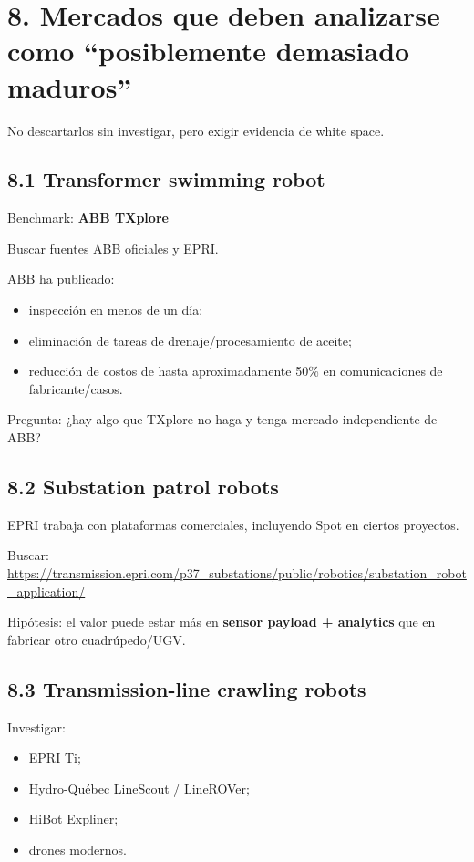\documentclass[11pt,a4paper]{article}
\begin{document}
\section*{8. Mercados que deben analizarse como ``posiblemente demasiado maduros''}
No descartarlos sin investigar, pero exigir evidencia de white space.


\subsection*{8.1 Transformer swimming robot}
Benchmark:
\textbf{ABB TXplore}

Buscar fuentes ABB oficiales y EPRI.

ABB ha publicado:

\begin{itemize}
\item inspección en menos de un día;
\item eliminación de tareas de drenaje/procesamiento de aceite;
\item reducción de costos de hasta aproximadamente 50\% en comunicaciones de fabricante/casos.
\end{itemize}

Pregunta:
¿hay algo que TXplore no haga y tenga mercado independiente de ABB?


\subsection*{8.2 Substation patrol robots}
EPRI trabaja con plataformas comerciales, incluyendo Spot en ciertos proyectos.

Buscar:
\url{https://transmission.epri.com/p37_substations/public/robotics/substation_robot_application/}

Hipótesis:
el valor puede estar más en \textbf{sensor payload + analytics} que en fabricar otro cuadrúpedo/UGV.


\subsection*{8.3 Transmission-line crawling robots}
Investigar:

\begin{itemize}
\item EPRI Ti;
\item Hydro-Québec LineScout / LineROVer;
\item HiBot Expliner;
\item drones modernos.
\end{itemize}
\end{document}
